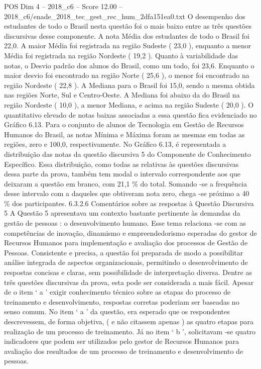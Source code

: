\begin{textsample}{POS Dim 4 – 2018\_c6 – Score 12.00 – 2018\_c6/enade\_2018\_tec\_gest\_rec\_hum\_2dfa151ea0.txt}
O desempenho dos estudantes de todo o Brasil nesta questão foi o mais baixo entre as três questões discursivas desse componente.
A nota Média dos estudantes de todo o Brasil foi 22,0.
A maior Média foi registrada na região Sudeste ( 23,0 ), enquanto a menor Média foi registrada na região Nordeste ( 19,2 ).
Quanto à variabilidade das notas, o Desvio padrão dos alunos do Brasil, como um todo, foi 23,6.
Enquanto o maior desvio foi encontrado na região Norte ( 25,6 ), o menor foi encontrado na região Nordeste ( 22,8 ).
A Mediana para o Brasil foi 15,0, sendo a mesma obtida nas regiões Norte, Sul e Centro-Oeste.
A Mediana foi abaixo da do Brasil na região Nordeste ( 10,0 ), a menor Mediana, e acima na região Sudeste ( 20,0 ).
O quantitativo elevado de notas baixas associadas a essa questão fica evidenciado no Gráfico 6.13.
Para o conjunto de alunos de Tecnologia em Gestão de Recursos Humanos do Brasil, as notas Mínima e Máxima foram as mesmas em todas as regiões, zero e 100,0, respectivamente.
No Gráfico 6.13, é representada a distribuição das notas da questão discursiva 5 do Componente de Conhecimento Específico.
Essa distribuição, como todas as relativas às questões discursivas dessa parte da prova, também tem modal o intervalo correspondente aos que deixaram a questão em branco, com 21,1 \% do total.
Somando -se a frequência desse intervalo com a daqueles que obtiveram nota zero, chega -se próximo a 40 \% dos participantes. 6.3.2.6 Comentários sobre as respostas à Questão Discursiva 5 A Questão 5 apresentava um contexto bastante pertinente às demandas da gestão de pessoas : o desenvolvimento humano.
Esse tema relaciona -se com as competências de inovação, dinamismo e empreendedorismo esperadas do gestor de Recursos Humanos para implementação e avaliação dos processos de Gestão de Pessoas.
Consistente e precisa, a questão foi preparada de modo a possibilitar análise integrada de aspectos organizacionais, permitindo o desenvolvimento de respostas concisas e claras, sem possibilidade de interpretação diversa.
Dentre as três questões discursivas da prova, esta pode ser considerada a mais fácil.
Apesar de o item ‘ a ’ exigir conhecimento técnico sobre as etapas do processo de treinamento e desenvolvimento, respostas corretas poderiam ser baseadas no senso comum.
No item ‘ a ’ da questão, era esperado que os respondentes descrevessem, de forma objetiva, ( e não citassem apenas ) as quatro etapas para realização de um processo de treinamento.
Já no item ‘ b ’, solicitavam -se quatro indicadores que podem ser utilizados pelo gestor de Recursos Humanos para avaliação dos resultados de um processo de treinamento e desenvolvimento de pessoas.

\end{textsample}
